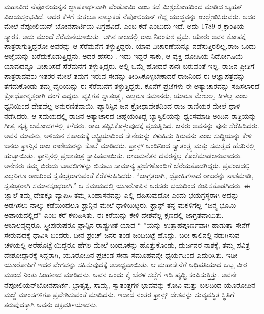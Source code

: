 ಮಹಾವೀರ ನೆಪೋಲಿಯನ್ನನ ಜ್ಞಾಪಕಾರ್ಥವಾಗಿ ವೆಂಡೋಮಿ ಎಂಬ ಕಡೆ ಮಿಶ್ರಲೋಹದಿಂದ ಮಾಡಿದ ಬೃಹತ್​ ವಿಜಯಸ್ತಂಭವಿದೆ. ಅದರ ಕೆಳಗೆ ಸುತ್ತಲೂ ನಾಲ್ಕುಕಡೆ ನೆಪೋಲಿಯನ್​ ಗೆದ್ದ ಯುದ್ಧವನ್ನು ಉಲ್ಲೇಖಿಸಿರುವರು. ಅದರ ಮೇಲೆ ನೆಪೋಲಿಯನ್​ ಬೋನಪಾರ್ಟಿಯ ವಿಗ್ರಹವಿದೆ.  ಎಂಬ ಕಡೆ  ಎಂಬುದು ಇದೆ. ಅದು 1789 ರ ಕ್ರಾಂತಿಯ ಸ್ಮಾರಕ. ಅದು ಮುಂದೆ ಸೆರೆಮನೆಯಾಯಿತು. ಆಗಿನ ಕಾಲದಲ್ಲಿ ರಾಜ ನಿರಂಕುಶ ಪ್ರಭು. ಯಾರು ಅವನ ಕೋಪಕ್ಕೆ ಪಾತ್ರರಾಗುತ್ತಿದ್ದರೋ ಅವರನ್ನು ಆ ಸೆರೆಮನೆಗೆ ತಳ್ಳುತ್ತಿದ್ದರು. ಯಾವ ವಿಚಾರಣೆಯನ್ನೂ ನಡೆಸುತ್ತಿರಲಿಲ್ಲ.ರಾಜ ಒಂದು ಆಜ್ಞೆಯನ್ನು ಬರೆದುಕೊಡುತ್ತಿದ್ದನು. ಅದರ ಹೆಸರು . ಇದು ಇದ್ದರೆ ಸಾಕು, ಆ ವ್ಯಕ್ತಿ ದೋಷಿಯೆ ನಿರ್ದೋಷಿಯೆ ಯಾವುದನ್ನೂ ವಿಚಾರಿಸದೆ ಸೆರೆಮನೆಗೆ ತಳ್ಳುತ್ತಿದ್ದರು. ಅಲ್ಲಿ ಒಮ್ಮೆ ಹೋದರೆ ಪುನಃ ಬರುವಂತೆ ಇಲ್ಲ. ರಾಜನ ಪ್ರೀತಿಗೆ ಪಾತ್ರರಾದವರು ಇತರರ ಮೇಲೆ ತಮಗೆ ಇರುವ ಸೇಡನ್ನು ತೀರಿಸಿಕೊಳ್ಳಬೇಕಾದರೆ ರಾಜನಿಂದ ಈ ಆಜ್ಞಾಪತ್ರವನ್ನು ತೆಗೆದುಕೊಂಡು ತಮ್ಮ ವೈರಿಯನ್ನು ಈ ಸೆರೆಮನೆಗೆ ತಳ್ಳುತ್ತಿದ್ದರು. ಕೊನೆಗೆ ಪ್ರಜೆಗಳು ಈ ಅತ್ಯಾಚಾರವನ್ನು ಸಹಿಸಲಾರದೆ ಕ್ರೋಧೋನ್ಮತ್ತರಾಗಿ ದಂಗೆ ಎದ್ದರು. ವ್ಯಕ್ತಿಗತ ಸ್ವಾತಂತ್ರ್ಯ, ಎಲ್ಲರೂ ಸಮಾನರು, ಯಾರೂ ಮೇಲಲ್ಲ, ಕೀಳಲ್ಲ ಎಂಬ ಧ್ವನಿಯಿಂದ ದೇಶವೆಲ್ಲ ಅನುರಣಿತವಾಯಿ. ಪ್ಯಾರಿಸ್ಸಿನ ಜನ ಕ್ರೋಧಾವೇಶದಿಂದ ರಾಜ ರಾಣಿಯರ ಮೇಲೆ ಧಾಳಿ ನಡೆಸಿದರು. ಆ ಸಮಯದಲ್ಲಿ ರಾಜನ ಅತ್ಯಾಚಾರದ ಚಿಹ್ನೆಯಂತಿದ್ದ ಬ್ಯಾಸ್ಟಿಲಿಯನ್ನು ಧ್ವಂಸಮಾಡಿ ಅಂದಿನ ರಾತ್ರಿಯನ್ನು ಗೀತ, ನೃತ್ಯ ಆಮೋದಗಳಲ್ಲಿ ಕಳೆದರು. ರಾಜ ತಪ್ಪಿಸಿಕೊಳ್ಳುವುದಕ್ಕೆ ಪ್ರಯತ್ನಿಸಿದ. ಜನರು ಅವನನ್ನು ಪುನಃ ಸೆರೆಹಿಡಿದರು. ಅವನ ಮಾವನು, ಅಳಿಯನ ಸಹಾಯಕ್ಕೆ ಆಸ್ಟ್ರಿಯಾದಿಂದ ಸೇನೆಯನ್ನು ಕಳುಹಿಸು ತ್ತಿರುವನು ಎಂಬ ಸುದ್ದಿಯನ್ನು ಕೇಳಿ ಜನರು ಫ್ರಾನ್ಸಿನ ರಾಜ ರಾಣಿಯರನ್ನು ಕೊಲೆ ಮಾಡಿದರು. ಫ್ರಾನ್ಸ್​ ಅಂದಿನಿಂದ ಸ್ವಾತಂತ್ರ್ಯ ಮತ್ತು ಸಮತ್ವದ ಹೆಸರಿನಲ್ಲಿ ಹುಚ್ಚಾಯಿತು. ಫ್ರಾನ್ಸಿನಲ್ಲಿ ಪ್ರಜಾತಂತ್ರ ಸ್ಥಾಪಿತವಾಯಿತು. ರಾಜಮನೆತನ ದವರನ್ನೆಲ್ಲ ಕೊಲೆಮಾಡಲನುವಾದರು. ಅನೇಕರು ತಮ್ಮ ಬಿರುದು ಬಾವಲಿಗಳನ್ನು ಬಿಸುಟು ಸಾಮಾನ್ಯ ಪ್ರಜೆಗಳೊಂದಿಗೆ ಬೆರೆಯತೊಡಗಿದ್ದರು. ಪ್ರಪಂಚದಲ್ಲಿ ಎಲ್ಲರಿಗೂ ರಾಜರಿಂದ ಸ್ವತಂತ್ರರಾಗುವಂತೆ ಕರೆಕಳುಹಿಸಿದರು. “ಜಾಗ್ರತರಾಗಿ, ದ್ರೋಹಿಗಳಾದ ರಾಜರನ್ನು ನಾಶಮಾಡಿ, ಸ್ವತಂತ್ರರಾಗಿ ಸಮಾನಸ್ಕಂಧರಾಗಿ.” ಆ ಸಮಯದಲ್ಲಿ ಯೂರೋಪಿನ ಅರಸರು ಭಯದಿಂದ ಕಂಪಿಸತೊಡಗಿದರು. ಈ ಜ್ವಾಲೆ ತಮ್ಮ ದೇಶಕ್ಕೂ ವ್ಯಾಪಿಸಿ ತಮ್ಮ ಸಿಂಹಾಸನವನ್ನು ಎಲ್ಲಿ ದಹಿಸುವುದೋ ಎಂದು ಭಯಗ್ರಸ್ಥರಾಗಿ ಅದನ್ನು ಅಡಗಿಸಲು ನಾಲ್ಕು ಕಡೆಯಿಂದಲೂ ಫ್ರಾನ್ಸಿನ ಮೇಲೆ ಧಾಳಿಯಿಟ್ಟರು. ಫ್ರಾನ್ಸ್​ ತನ್ನ ಮಕ್ಕಳಿಗೆಲ್ಲ “ಜನ್ಮ ಭೂಮಿ ಅಪಾಯದಲ್ಲಿದೆ” ಎಂಬ ಕರೆ ಕಳುಹಿಸಿತು. ಈ ಕರೆಯನ್ನು ಕೇಳಿ ದೇಶವೆಲ್ಲ ಕ್ಷಣದಲ್ಲಿ ಜಾಗ್ರತವಾಯಿತು. ಆಬಾಲವೃದ್ಧರೂ, ಸ್ತ್ರೀಪುರುಷರೂ ಫ್ರಾನ್ಸಿನ ರಾಷ್ಟ್ರಗೀತೆ ಯಾದ “ ”ಯನ್ನು ಉತ್ಸಾಹಪೂರ್ಣವಾಗಿ ಹಾಡುತ್ತಾ ಸೇನೆಗೆ ಸೇರುವುದಕ್ಕೆ ಧಾವಿಸಿ ಬಂದರು. ದೀನ ಫ್ರೆಂಚ್​ ಜನರ ತಂಡ ಚಿಂದಿಬಟ್ಟೆ ಹೊದ್ದು, ಬರೀ ಕಾಲಿನಲ್ಲಿ ನಡುಗಿಸುವ ಚಳಿಯಲ್ಲಿ ಅರೆಹೊಟ್ಟೆ ಯಿದ್ದರೂ ಹೆಗಲ ಮೇಲೆ ಬಂದೂಕನ್ನು ಹೊತ್ತುಕೊಂಡು, ದುರ್ಜನರ ನಾಶಕ್ಕೆ, ತಮ್ಮ ಪವಿತ್ರ ದೇಶೋದ್ಧಾರಕ್ಕೆ ಸಿದ್ಧರಾಗಿ, ಯೂರೋಪಿನ ಪ್ರಚಂಡ ಸೇನಾ ಸಮೂಹವನ್ನೇ ಧೈರ್ಯದಿಂದ ಎದುರಿಸಿತು. ಇಡೀ ಯೂರೋಪಿಗೆ ಇದರ ವೇಗವನ್ನು ಸಹಿಸುವುದಕ್ಕೆ ಅಸಾಧ್ಯವಾಯಿತು. ಆ ಮಹಾಸೇನೆಗೆ ಅಧಿಪತಿಯಾದ ಒಬ್ಬ ವೀರ ಮುಂದೆ ನಿಂತು ಸಿಂಹನಾದ ಮಾಡಿದನು. ಅವನ ಒಂದು ಕೈ ಬೆರಳ ಸಲ್ಲೆಗೆ ಇಡಿ ಪೃಥ್ವಿ ಕಂಪಿಸುತ್ತಿತ್ತು. ಅವನೇ ನೆಪೋಲಿಯನ್​ ಬೋನಪಾರ್ಟೆ. ಭ್ರಾತೃತ್ವ, ಸಾಮ್ಯ, ಸ್ವಾತಂತ್ರ್ಯಗಳ ಭಾವವನ್ನು ಕೋವಿ ಮತ್ತು ಬಲದಿಂದ ಯೂರೋಪಿನ ಮಜ್ಜೆ ಮಾಂಸಗಳಿಗೂ ಪ್ರವೇಶಿಸುವಂತೆ ಮಾಡಿದನು. ಇದಾದ ನಂತರ ಫ್ರಾನ್ಸ್​ ದೇಶವನ್ನು ಸುವ್ಯವಸ್ಥಿತ ಸ್ಥಿತಿಗೆ ತರುವುದಕ್ಕಾಗಿ ಅವನು ಚಕ್ರವರ್ತಿಯಾದನು.

